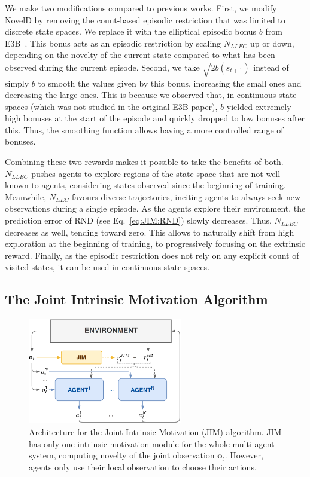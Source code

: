 We make two modifications compared to previous works. First, we modify NovelD by removing the count-based episodic restriction that was limited to discrete state spaces. We replace it with the elliptical episodic bonus $b$ from E3B~\citep{Henaff2022_E3B}. This bonus acts as an episodic restriction by scaling $N_{LLEC}$ up or down, depending on the novelty of the current state compared to what has been observed during the current episode. Second, we take $\sqrt{2b(s_{t+1})}$ instead of simply $b$ to smooth the values given by this bonus, increasing the small ones and decreasing the large ones. This is because we observed that, in continuous state spaces (which was not studied in the original E3B paper), $b$ yielded extremely high bonuses at the start of the episode and quickly dropped to low bonuses after this. Thus, the smoothing function allows having a more controlled range of bonuses. 

Combining these two rewards makes it possible to take the benefits of both. $N_{LLEC}$ pushes agents to explore regions of the state space that are not well-known to agents, considering states observed since the beginning of training. Meanwhile, $N_{EEC}$ favours diverse trajectories, inciting agents to always seek new observations during a single episode. As the agents explore their environment, the prediction error of RND (see Eq.~\eqref{eq:JIM:RND}) slowly decreases. Thus, $N_{LLEC}$ decreases as well, tending toward zero. This allows to naturally shift from high exploration at the beginning of training, to progressively focusing on the extrinsic reward. Finally, as the episodic restriction does not rely on any explicit count of visited states, it can be used in continuous state spaces. 




\subsection{The Joint Intrinsic Motivation Algorithm}

\begin{figure}[h]
    \centering
    \includegraphics[width=0.6\textwidth]{Figures/JIM/archi_jim.png}
    \caption{Architecture for the Joint Intrinsic Motivation (JIM) algorithm. JIM has only one intrinsic motivation module for the whole multi-agent system, computing novelty of the joint observation $\mathbf{o}_t$. However, agents only use their local observation to choose their actions.}
    \label{fig:JIM:archi}
\end{figure}

